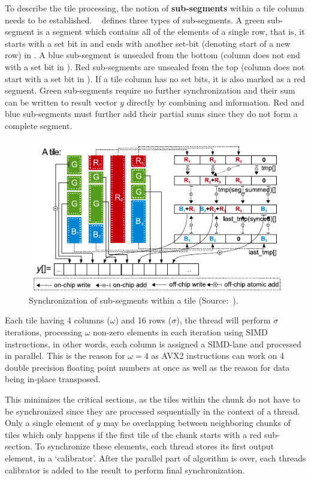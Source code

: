\documentclass[thesis=M,english]{FITthesis}[2019/12/23]
\begin{document}
To describe the tile processing, the notion of \textbf{sub-segments} within a tile column needs
to be established.
~\cite{liu2015csr5} defines three types of sub-segments. A green sub-segment is a segment which contains
all of the elements of a single row, that is, it starts with a set bit in  and ends with
another set-bit (denoting start of a new row) in . A blue sub-segment is unsealed from
the bottom (column does not end with a set bit in ).
Red sub-segments are unsealed from the top (column does not start with a set bit in ).
If a tile column has no set bits, it is also marked as a red segment.
Green sub-segments require no further synchronization and their sum can be written to result vector \(y\)
directly by combining  and  information. Red and blue sub-segments must
further add their partial sums since they do not form a complete segment.


\begin{figure}[htp]
    \centering
    \includegraphics[scale=0.7]{static/A_secs.pdf}
    \caption{Synchronization of sub-segments within a tile (Source:~\cite{liu2015csr5}).}
\end{figure}

Each tile having 4 columns (\(\omega{}\)) and 16 rows (\(\sigma{}\)), the
thread will perform \(\sigma{}\) iterations,
processing \(\omega{}\) non-zero elements in each iteration using SIMD instructions, in other words,
each column is assigned a SIMD-lane and processed in parallel. This is the reason
for \(\omega{} = 4\) as AVX2 instructions can work on 4 double precision floating point numbers at once
as well as the reason for data being in-place transposed.


This minimizes the critical sections, as the tiles within the chunk do not have to be
synchronized since they are processed sequentially in the context of a thread. Only a single element of
\(y\) may be overlapping between neighboring chunks of tiles which only happens if the first tile of the
chunk starts with a red sub-section. To synchronize these elements, each thread
stores its first output element, in a `calibrator'. After the parallel part of algorithm is over, each
threads calibrator is added to the result to perform final synchronization.
\end{document}
